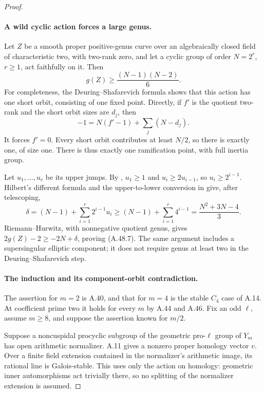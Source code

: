 \begin{proof}
\paragraph{A wild cyclic action forces a large genus.}
Let \(Z\) be a smooth proper positive-genus curve
over an algebraically closed field of characteristic
two, with two-rank zero, and let a cyclic group of
order \(N=2^r\), \(r\ge1\), act faithfully on it.
Then
\[
                         g(Z)\ge\frac{(N-1)(N-2)}6.
                                                               \tag{A.48.7}
\]
For completeness, the Deuring--Shafarevich formula
\cite[formula (6), printed p.5; Lemma 3.2 and
Remark 3.1, printed pp.7--8]{fghGiuliettiKorchmaros}
shows that this action has one short orbit, consisting
of one fixed point. Directly, if \(f'\) is the
quotient two-rank and the short orbit sizes are
\(d_j\), then
\[
                    -1=N(f'-1)+\sum_j(N-d_j).
\]
It forces \(f'=0\). Every short orbit contributes
at least \(N/2\), so there is exactly one, of
size one. There is thus exactly one ramification
point, with full inertia group.

Let \(u_1,\ldots,u_r\) be its upper jumps.
By \cite[Theorem 1.1(c), manuscript p.2]{fghObusPries},
\(u_1\ge1\) and \(u_i\ge2u_{i-1}\), so
\(u_i\ge2^{i-1}\). Hilbert's different formula
and the upper-to-lower conversion in
\cite[Section 2.4, manuscript p.4]{fghObusPries}
give, after telescoping,
\[
 \delta=(N-1)+\sum_{i=1}^r2^{i-1}u_i
       \ge (N-1)+\sum_{i=1}^r4^{i-1}
        =\frac{N^2+3N-4}{3}.                       \tag{A.48.8}
\]
Riemann--Hurwitz, with nonnegative quotient genus,
gives \(2g(Z)-2\ge-2N+\delta\), proving
(A.48.7). The same argument includes a supersingular
elliptic component; it does not require genus at
least two in the Deuring--Shafarevich step.

\paragraph{The induction and its component-orbit contradiction.}
The assertion for \(m=2\) is A.40, and that for
\(m=4\) is the stable \(C_4\) case of A.14.
At coefficient prime two it holds for every \(m\)
by A.44 and A.46. Fix an odd \(\ell\), assume
\(m\ge8\), and suppose the assertion known for
\(m/2\).

Suppose a noncuspidal procyclic subgroup of the
geometric pro-\(\ell\) group of \(Y_m\) has open
arithmetic normalizer. A.11 gives a nonzero proper
homology vector \(v\). Over a finite field
extension contained in the normalizer's arithmetic
image, its rational line is Galois-stable. This
uses only the action on homology: geometric inner
automorphisms act trivially there, so no splitting
of the normalizer extension is assumed.


\end{proof}
